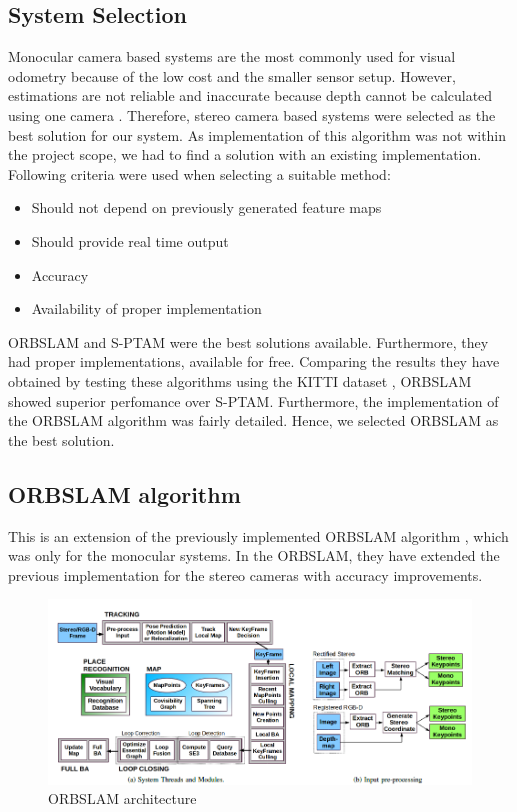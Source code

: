 \subsection{System Selection}
Monocular camera based systems are the most commonly used for visual odometry because of the low cost and the smaller sensor setup. However, estimations are not reliable and inaccurate because depth cannot be calculated using one camera \cite{ra:ORB_SLAM2}. Therefore, stereo camera based systems were selected as the best solution for our system. As implementation of this algorithm was not within the project scope, we had to find a solution with an existing implementation. Following criteria were used when selecting a suitable method:
\begin{itemize}
    \item Should not depend on previously generated feature maps
    \item Should provide real time output
    \item Accuracy
    \item Availability of proper implementation
\end{itemize}

\gls{ORBSLAM} \cite{ra:ORB_SLAM2} and \gls{S-PTAM} \cite{ra:S-PTAM} were the best solutions available. Furthermore, they had proper implementations, available for free. Comparing the results they have obtained by testing these algorithms using the KITTI dataset \cite{ra:KITTI}, \gls{ORBSLAM} showed superior perfomance over \gls{S-PTAM}. Furthermore, the implementation of the \gls{ORBSLAM} algorithm was fairly detailed. Hence, we selected \gls{ORBSLAM} as the best solution.


\subsection{\gls{ORBSLAM} algorithm}
This is an extension of the previously implemented \gls{ORBSLAM} algorithm \cite{ra:ORB_SLAM}, which was only for the monocular systems. In the \gls{ORBSLAM}, they have extended the previous implementation for the stereo cameras with accuracy improvements\cite{ra:ORB_SLAM2}. 
\begin{figure}[t]
	\centering
	\includegraphics[width=\textwidth]{figs/ORB_SYSTEM.png}
	\vspace{-0.5cm}
	\caption{\gls{ORBSLAM} architecture \cite{ra:ORB_SLAM2}}
	\label{fig:ra:ORB_SYSTEM}
	\vspace{0.5cm}
\end{figure}


